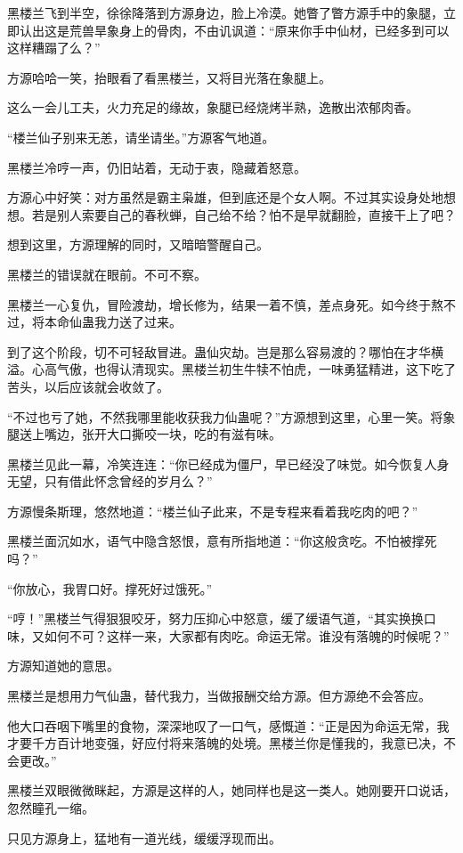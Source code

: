 \begin{this_body}
黑楼兰飞到半空，徐徐降落到方源身边，脸上冷漠。她瞥了瞥方源手中的象腿，立即认出这是荒兽旱象身上的骨肉，不由讥讽道：“原来你手中仙材，已经多到可以这样糟蹋了么？”

方源哈哈一笑，抬眼看了看黑楼兰，又将目光落在象腿上。

这么一会儿工夫，火力充足的缘故，象腿已经烧烤半熟，逸散出浓郁肉香。

“楼兰仙子别来无恙，请坐请坐。”方源客气地道。

黑楼兰冷哼一声，仍旧站着，无动于衷，隐藏着怒意。

方源心中好笑：对方虽然是霸主枭雄，但到底还是个女人啊。不过其实设身处地想想。若是别人索要自己的春秋蝉，自己给不给？怕不是早就翻脸，直接干上了吧？

想到这里，方源理解的同时，又暗暗警醒自己。

黑楼兰的错误就在眼前。不可不察。

黑楼兰一心复仇，冒险渡劫，增长修为，结果一着不慎，差点身死。如今终于熬不过，将本命仙蛊我力送了过来。

到了这个阶段，切不可轻敌冒进。蛊仙灾劫。岂是那么容易渡的？哪怕在才华横溢。心高气傲，也得认清现实。黑楼兰初生牛犊不怕虎，一味勇猛精进，这下吃了苦头，以后应该就会收敛了。

“不过也亏了她，不然我哪里能收获我力仙蛊呢？”方源想到这里，心里一笑。将象腿送上嘴边，张开大口撕咬一块，吃的有滋有味。

黑楼兰见此一幕，冷笑连连：“你已经成为僵尸，早已经没了味觉。如今恢复人身无望，只有借此怀念曾经的岁月么？”

方源慢条斯理，悠然地道：“楼兰仙子此来，不是专程来看着我吃肉的吧？”

黑楼兰面沉如水，语气中隐含怒恨，意有所指地道：“你这般贪吃。不怕被撑死吗？”

“你放心，我胃口好。撑死好过饿死。”

“哼！”黑楼兰气得狠狠咬牙，努力压抑心中怒意，缓了缓语气道，“其实换换口味，又如何不可？这样一来，大家都有肉吃。命运无常。谁没有落魄的时候呢？”

方源知道她的意思。

黑楼兰是想用力气仙蛊，替代我力，当做报酬交给方源。但方源绝不会答应。

他大口吞咽下嘴里的食物，深深地叹了一口气，感慨道：“正是因为命运无常，我才要千方百计地变强，好应付将来落魄的处境。黑楼兰你是懂我的，我意已决，不会更改。”

黑楼兰双眼微微眯起，方源是这样的人，她同样也是这一类人。她刚要开口说话，忽然瞳孔一缩。

只见方源身上，猛地有一道光线，缓缓浮现而出。


\end{this_body}
